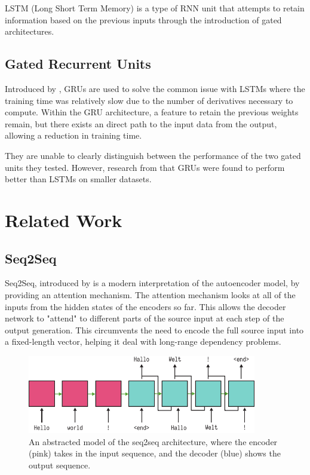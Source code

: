 \documentclass[12pt,twoside]{report}
\begin{document}
LSTM (Long Short Term Memory) is a type of RNN unit that attempts to retain information based on the previous inputs through the introduction of gated architectures.

\subsection{Gated Recurrent Units}

Introduced by \cite{cho_properties_2014}, GRUs are used to solve the common issue with LSTMs where the training time was relatively slow due to the number of derivatives necessary to compute. Within the GRU architecture, a feature to retain the previous weights remain, but there exists an direct path to the input data from the output, allowing a reduction in training time. 

They are unable to clearly distinguish between the performance of the two gated units they tested.
However, research from \cite{chung_empirical_2014} that GRUs were found to perform better than LSTMs on smaller datasets. 

\section{Related Work}

\subsection{Seq2Seq}

Seq2Seq, introduced by \cite{sutskever_sequence_2014} is a modern interpretation of the autoencoder model, by providing an attention mechanism. The attention mechanism looks at all of the inputs from the hidden states of the encoders so far. This allows the decoder network to "attend" to different parts of the source input at each step of the output generation. This circumvents the need to encode the full source input into a fixed-length vector, helping it deal with long-range dependency problems.


\begin{figure}[!ht]
      
	\centering
	\includegraphics[width=100mm]{diagrams/seq2seq.pdf}
	\caption{An abstracted model of the seq2seq architecture, where the encoder (pink) takes in the input sequence, and the decoder (blue) shows the output sequence.\label{seq2seq}}
  \end{figure}
\end{document}
